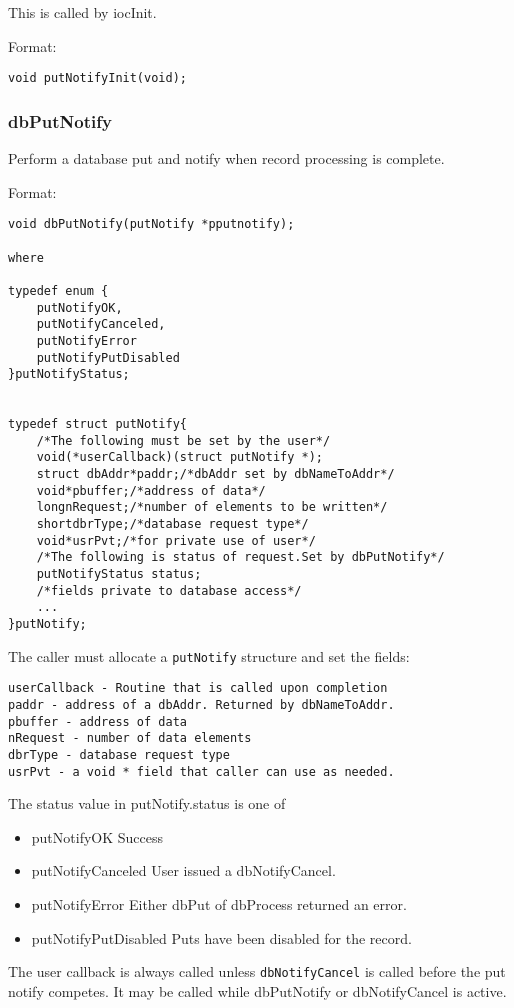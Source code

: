 This is called by iocInit.

Format:

\begin{verbatim}void putNotifyInit(void);
\end{verbatim}\subsubsection{dbPutNotify}

Perform a database put and notify when record processing is complete.

Format:

\begin{verbatim}void dbPutNotify(putNotify *pputnotify);

where

typedef enum {
    putNotifyOK,
    putNotifyCanceled,
    putNotifyError
    putNotifyPutDisabled
}putNotifyStatus;


typedef struct putNotify{
    /*The following must be set by the user*/
    void(*userCallback)(struct putNotify *);
    struct dbAddr*paddr;/*dbAddr set by dbNameToAddr*/
    void*pbuffer;/*address of data*/
    longnRequest;/*number of elements to be written*/
    shortdbrType;/*database request type*/
    void*usrPvt;/*for private use of user*/
    /*The following is status of request.Set by dbPutNotify*/
    putNotifyStatus status;
    /*fields private to database access*/
    ...
}putNotify;
\end{verbatim}
The caller must allocate a \verb|putNotify| structure and set the fields:

\begin{verbatim}userCallback - Routine that is called upon completion
paddr - address of a dbAddr. Returned by dbNameToAddr.
pbuffer - address of data
nRequest - number of data elements
dbrType - database request type
usrPvt - a void * field that caller can use as needed.
\end{verbatim}The status value in putNotify.status is one of

\begin{itemize}\item  {}putNotifyOK Success

\item {}putNotifyCanceled User issued a dbNotifyCancel.

\item putNotifyError Either dbPut of dbProcess returned an error.

\item putNotifyPutDisabled Puts have been disabled for the record.

\end{itemize}The user callback is always called unless \verb|dbNotifyCancel| is called before the put notify competes. It may be called 
while dbPutNotify or dbNotifyCancel is active.

